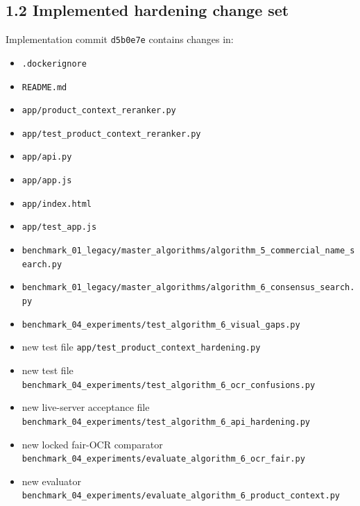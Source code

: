 \subsection{1.2 Implemented hardening change set}\label{12-implemented-hardening-change-set}

Implementation commit \texttt{d5b0e7e} contains changes in:

\begin{itemize}
\tightlist
\item
  \texttt{.dockerignore}
\item
  \texttt{README.md}
\item
  \texttt{app/product\_\allowbreak{}context\_\allowbreak{}reranker.py}
\item
  \texttt{app/test\_\allowbreak{}product\_\allowbreak{}context\_\allowbreak{}reranker.py}
\item
  \texttt{app/api.py}
\item
  \texttt{app/app.js}
\item
  \texttt{app/index.html}
\item
  \texttt{app/test\_\allowbreak{}app.js}
\item
  \texttt{benchmark\_\allowbreak{}01\_\allowbreak{}legacy/master\_\allowbreak{}algorithms/algorithm\_\allowbreak{}5\_\allowbreak{}commercial\_\allowbreak{}name\_\allowbreak{}search.py}
\item
  \texttt{benchmark\_\allowbreak{}01\_\allowbreak{}legacy/master\_\allowbreak{}algorithms/algorithm\_\allowbreak{}6\_\allowbreak{}consensus\_\allowbreak{}search.py}
\item
  \texttt{benchmark\_\allowbreak{}04\_\allowbreak{}experiments/test\_\allowbreak{}algorithm\_\allowbreak{}6\_\allowbreak{}visual\_\allowbreak{}gaps.py}
\item
  new test file \texttt{app/test\_\allowbreak{}product\_\allowbreak{}context\_\allowbreak{}hardening.py}
\item
  new test file \texttt{benchmark\_\allowbreak{}04\_\allowbreak{}experiments/test\_\allowbreak{}algorithm\_\allowbreak{}6\_\allowbreak{}ocr\_\allowbreak{}confusions.py}
\item
  new live-server acceptance file \texttt{benchmark\_\allowbreak{}04\_\allowbreak{}experiments/test\_\allowbreak{}algorithm\_\allowbreak{}6\_\allowbreak{}api\_\allowbreak{}hardening.py}
\item
  new locked fair-OCR comparator \texttt{benchmark\_\allowbreak{}04\_\allowbreak{}experiments/evaluate\_\allowbreak{}algorithm\_\allowbreak{}6\_\allowbreak{}ocr\_\allowbreak{}fair.py}
\item
  new evaluator \texttt{benchmark\_\allowbreak{}04\_\allowbreak{}experiments/evaluate\_\allowbreak{}algorithm\_\allowbreak{}6\_\allowbreak{}product\_\allowbreak{}context.py}
\end{itemize}

